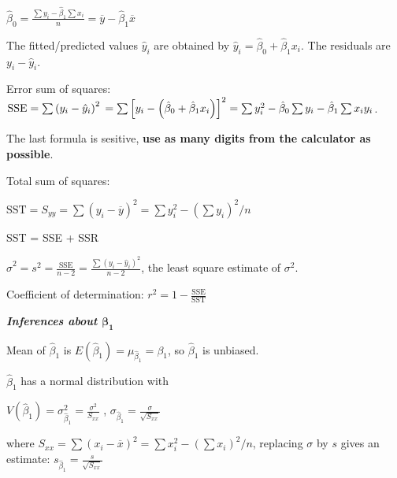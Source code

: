 \documentclass{article}
\newcommand{\smalltitle}[1]{
	\noindent
	\textbf{\textit{#1}}
}
\begin{document}
	$\hat { \beta } _ { 0 } = \frac { \sum y _ { i } - \hat { \beta } _ { 1 } \sum x _ { i } } { n } = \overline { y } - \hat { \beta } _ { 1 } \overline { x }$
	
	The fitted/predicted values $\hat{y}_i$ are obtained by $\hat { y } _ { i } = \hat { \beta } _ { 0 } + \hat { \beta } _ { 1 } x _ { i }$. The residuals are $y _ { i } - \hat { y } _ { i }$.
	
	Error sum of squares: $\mathrm { SSE } = \sum \left( y _ { i } - \hat { y } _ { i } \right) ^ { 2 } \\= \sum \left[ y _ { i } - \left( \hat { \beta } _ { 0 } + \hat { \beta } _ { 1 } x _ { i } \right) \right] ^ { 2 } = \sum y _ { i } ^ { 2 } - \hat { \beta } _ { 0 } \sum y _ { i } - \hat { \beta } _ { 1 } \sum x _ { i } y _ { i }$. 
	
	The last formula is sesitive, \textbf{use as many digits from the calculator as possible}.
	
	Total sum of squares: 
	
	$\mathrm { SST } = S _ { y y } = \sum \left( y _ { i } - \overline { y } \right) ^ { 2 } = \sum y _ { i } ^ { 2 } - \left( \sum y _ { i } \right) ^ { 2 } / n$
	
	SST = SSE + SSR
	
	$\hat { \sigma } ^ { 2 } = s ^ { 2 } = \frac { \mathrm { SSE } } { n - 2 } = \frac { \sum \left( y _ { i } - \hat { y } _ { i } \right) ^ { 2 } } { n - 2 }$, the least square estimate of $\sigma^2$.
	
	Coefficient of determination: $r ^ { 2 } = 1 - \frac { \mathrm { SSE } } { \mathrm { SST } }$
	
	
	
	\smalltitle{Inferences about $\mathbf{\beta_1}$}
	
	Mean of $\hat{ \beta }_1$ is $E \left( \hat { \beta } _ { 1 } \right) = \mu _ { \hat{\beta} _ { 1 } } = \beta _ { 1 }$, so $\hat{ \beta }_1$ is unbiased.
	
	$\hat{ \beta }_1$ has a normal distribution with 
	
	$V \left( \hat { \beta } _ { 1 } \right) = \sigma _ { \hat{\beta} _ { 1 } } ^ { 2 } = \frac { \sigma ^ { 2 } } { S _ { x x } }$
	,
	$\sigma _ { \hat { \beta } _ { 1 } } = \frac { \sigma } { \sqrt { S _ { x x } } }$
	
	where $S _ { x x } = \sum \left( x _ { i } - \overline { x } \right) ^ { 2 } = \sum x _ { i } ^ { 2 } - \left( \sum x _ { i } \right) ^ { 2 } / n$, replacing $\sigma$ by $s$ gives an estimate: $s _ { \hat { \beta } _ { 1 } } = \frac { s } { \sqrt { S _ { x x } } }$
	
\end{document}
